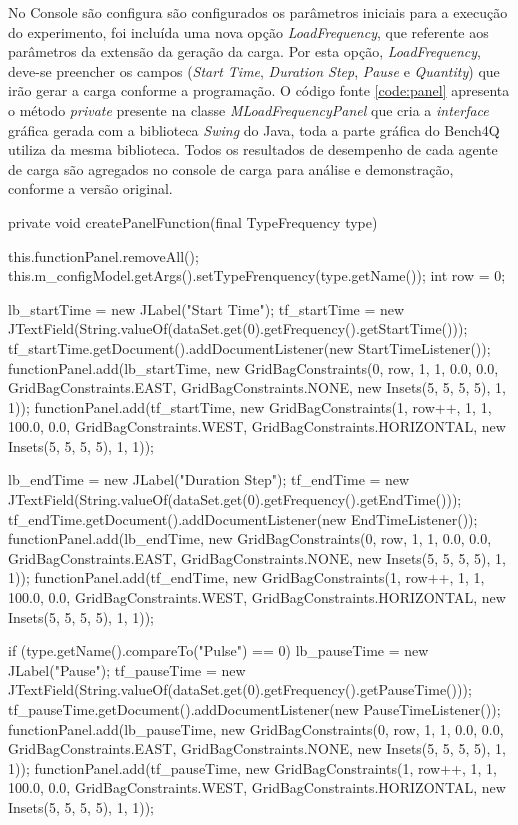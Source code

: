 No Console são configura são configurados os parâmetros iniciais para a execução do experimento, foi incluída uma nova opção \textit{LoadFrequency}, que referente aos parâmetros da extensão da geração da carga. Por esta opção, \textit{LoadFrequency}, deve-se preencher os campos (\textit{Start Time}, \textit{Duration Step}, \textit{Pause} e \textit{Quantity}) que irão gerar a carga conforme a programação. O código fonte \ref{code:panel} apresenta o método \textit{private} presente na classe \textit{MLoadFrequencyPanel} que cria a \textit{interface} gráfica gerada com a biblioteca \textit{Swing} do Java, toda a parte gráfica do Bench4Q utiliza da mesma biblioteca. Todos os resultados de desempenho de cada agente de carga são agregados no console de carga para análise e demonstração, conforme a versão original.

\begin{codigo}[caption={Código para gerar a os parâmetros para a modulação}, label={code:panel}, breaklines=true]
	private void createPanelFunction(final TypeFrequency type) {
		
		this.functionPanel.removeAll();
		this.m_configModel.getArgs().setTypeFrenquency(type.getName());
		int row = 0;
		
		lb_startTime = new JLabel("Start Time");
		tf_startTime = new JTextField(String.valueOf(dataSet.get(0).getFrequency().getStartTime()));
		tf_startTime.getDocument().addDocumentListener(new StartTimeListener());
		functionPanel.add(lb_startTime, new GridBagConstraints(0, row, 1, 1, 0.0, 0.0, GridBagConstraints.EAST,
		GridBagConstraints.NONE, new Insets(5, 5, 5, 5), 1, 1));
		functionPanel.add(tf_startTime, new GridBagConstraints(1, row++, 1, 1, 100.0, 0.0, GridBagConstraints.WEST,
		GridBagConstraints.HORIZONTAL, new Insets(5, 5, 5, 5), 1, 1));
		
		lb_endTime = new JLabel("Duration Step");
		tf_endTime = new JTextField(String.valueOf(dataSet.get(0).getFrequency().getEndTime()));
		tf_endTime.getDocument().addDocumentListener(new EndTimeListener());
		functionPanel.add(lb_endTime, new GridBagConstraints(0, row, 1, 1, 0.0, 0.0, GridBagConstraints.EAST,
		GridBagConstraints.NONE, new Insets(5, 5, 5, 5), 1, 1));
		functionPanel.add(tf_endTime, new GridBagConstraints(1, row++, 1, 1, 100.0, 0.0, GridBagConstraints.WEST,
		GridBagConstraints.HORIZONTAL, new Insets(5, 5, 5, 5), 1, 1));
		
		if (type.getName().compareTo("Pulse") == 0) {
			lb_pauseTime = new JLabel("Pause");
			tf_pauseTime = new JTextField(String.valueOf(dataSet.get(0).getFrequency().getPauseTime()));
			tf_pauseTime.getDocument().addDocumentListener(new PauseTimeListener());
			functionPanel.add(lb_pauseTime, new GridBagConstraints(0, row, 1, 1, 0.0, 0.0, GridBagConstraints.EAST,
			GridBagConstraints.NONE, new Insets(5, 5, 5, 5), 1, 1));
			functionPanel.add(tf_pauseTime, new GridBagConstraints(1, row++, 1, 1, 100.0, 0.0, GridBagConstraints.WEST,
			GridBagConstraints.HORIZONTAL, new Insets(5, 5, 5, 5), 1, 1));
		}
		
}
\end{codigo}

